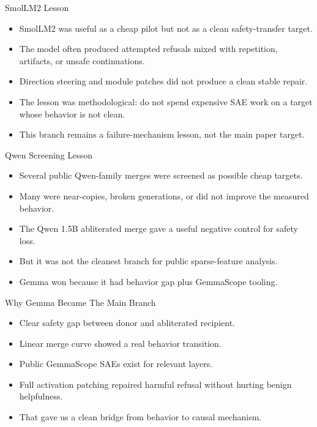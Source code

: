 \documentclass[aspectratio=169]{beamer}
\begin{document}
\begin{frame}{SmolLM2 Lesson}
\small
\begin{itemize}
  \item SmolLM2 was useful as a cheap pilot but not as a clean safety-transfer target.
  \item The model often produced attempted refusals mixed with repetition, artifacts, or unsafe continuations.
  \item Direction steering and module patches did not produce a clean stable repair.
  \item The lesson was methodological: do not spend expensive SAE work on a target whose behavior is not clean.
  \item This branch remains a failure-mechanism lesson, not the main paper target.
\end{itemize}
\end{frame}

\begin{frame}{Qwen Screening Lesson}
\small
\begin{itemize}
  \item Several public Qwen-family merges were screened as possible cheap targets.
  \item Many were near-copies, broken generations, or did not improve the measured behavior.
  \item The Qwen 1.5B abliterated merge gave a useful negative control for safety loss.
  \item But it was not the cleanest branch for public sparse-feature analysis.
  \item Gemma won because it had behavior gap plus GemmaScope tooling.
\end{itemize}
\end{frame}

\begin{frame}{Why Gemma Became The Main Branch}
\small
\begin{itemize}
  \item Clear safety gap between donor and abliterated recipient.
  \item Linear merge curve showed a real behavior transition.
  \item Public GemmaScope SAEs exist for relevant layers.
  \item Full activation patching repaired harmful refusal without hurting benign helpfulness.
  \item That gave us a clean bridge from behavior to causal mechanism.
\end{itemize}
\end{frame}
\end{document}
